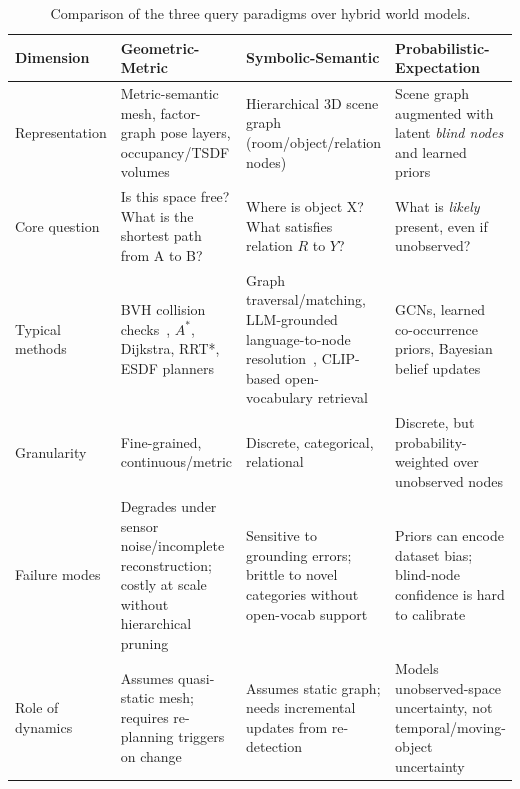 \begin{table}[t]
\centering
\scriptsize
\setlength{\tabcolsep}{3pt}
\renewcommand{\arraystretch}{0.0}
\caption{Comparison of the three query paradigms over hybrid world models.}
\label{tab:query_paradigms}
\begin{tabularx}{\textwidth}{@{}l X X X@{}}
\toprule
\textbf{Dimension} & \textbf{Geometric-Metric} & \textbf{Symbolic-Semantic} & \textbf{Probabilistic-Expectation} \\
\midrule
Representation &
Metric-semantic mesh, factor-graph pose layers, occupancy/TSDF volumes &
Hierarchical 3D scene graph (room/object/relation nodes) &
Scene graph augmented with latent \textit{blind nodes} and learned priors \\
\addlinespace
Core question &
Is this space free? What is the shortest path from A to B? &
Where is object X? What satisfies relation $R$ to $Y$? &
What is \textit{likely} present, even if unobserved? \\
\addlinespace
Typical methods &
BVH collision checks~\cite{rosinol_kimera_2021}, $A^*$, Dijkstra, RRT*, ESDF planners &
Graph traversal/matching, LLM-grounded language-to-node resolution~\cite{gorlo_long-term_2024}, CLIP-based open-vocabulary retrieval &
GCNs, learned co-occurrence priors, Bayesian belief updates~\cite{saucedo_estimating_2025} \\
\addlinespace
Granularity &
Fine-grained, continuous/metric &
Discrete, categorical, relational &
Discrete, but probability-weighted over unobserved nodes \\
\addlinespace
Failure modes &
Degrades under sensor noise/incomplete reconstruction; costly at scale without hierarchical pruning &
Sensitive to grounding errors; brittle to novel categories without open-vocab support &
Priors can encode dataset bias; blind-node confidence is hard to calibrate \\
\addlinespace
Role of dynamics &
Assumes quasi-static mesh; requires re-planning triggers on change &
Assumes static graph; needs incremental updates from re-detection &
Models unobserved-space uncertainty, not temporal/moving-object uncertainty \\
\bottomrule
\end{tabularx}
\end{table}

